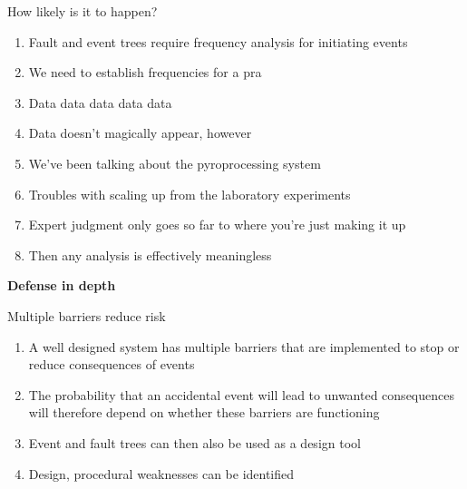 \documentclass[aspectratio=1610,pdftex,dvipsnames,compress,xcolor={dvipsnames}]{beamer}
\newcommand{\acs}{\acrshort} %
\begin{document}
\begin{frame}{How likely is it to happen?}
    \begin{enumerate}[series=outerlist,topsep=0pt,itemsep=11pt,leftmargin=*,label=(\arabic*)]
        \item[]Fault and event trees require frequency analysis for initiating events
        \item[]We need to establish frequencies for a \acs{pra}
        \item[]Data data data data data
        \item[]Data doesn't magically appear, however
        \item[]We've been talking about the pyroprocessing system
        \item[]Troubles with scaling up from the laboratory experiments
        \item[]Expert judgment only goes so far to where you're just making it up
        \item[]Then any analysis is effectively meaningless
    \end{enumerate}
\end{frame}


\begin{frame}[plain]{}
    \centering\LARGE\textbf{Defense in depth}
\end{frame}


\addtocounter{framenumber}{-1}
\begin{frame}{Multiple barriers reduce risk}
    \begin{enumerate}[series=outerlist,topsep=0pt,itemsep=21pt,leftmargin=*,label=(\arabic*)]
        \item[]A well designed system has multiple barriers that are implemented to stop or reduce consequences of events
        \item[]The probability that an accidental event will lead to unwanted consequences will therefore depend on whether these barriers are functioning
        \item[]Event and fault trees can then also be used as a design tool
        \item[]Design, procedural weaknesses can be identified
    \end{enumerate}
\end{frame}
\end{document}
